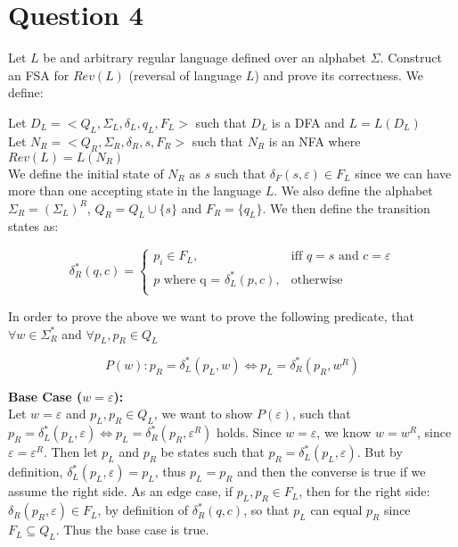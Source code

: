 \documentclass[20pt]{article}
\begin{document}
\section*{Question 4}
\begin{text}
    Let $L$ be and arbitrary regular language defined over an alphabet $\Sigma$. Construct an FSA for $Rev(L)$ (reversal of language $L$) and prove its correctness. We define:
    
    \noindent
    Let $D_L = <Q_L, \Sigma_L, \delta_L, q_L, F_L>$ such that $D_L$ is a DFA and $L = L(D_L)$\\
    Let $N_R = <Q_R, \Sigma_R, \delta_R, s, F_R>$ such that $N_R$ is an NFA where $Rev(L) = L(N_R)$\\
    We define the initial state of $N_R$ as $s$ such that $\delta_F(s,\varepsilon) \in F_L$ since we can have more than one accepting state in the language $L$. We also define the alphabet $\Sigma_R = (\Sigma_L)^R$, $Q_R = Q_L \cup \{s\}$ and $F_R = \{q_L\}$. We then define the transition states as:
\end{text}

\begin{equation}
    \delta_R^{*}(q, c) =
    \begin{cases}
      p_i \in F_L, & \text{iff $q = s$ and $c = \varepsilon$}\nonumber\\
      p \text{ where q = $\delta_L^*(p, c)$}, & \text{otherwise}\nonumber\\
    \end{cases}
\end{equation}

\noindent
\begin{text}
    In order to prove the above we want to prove the following predicate, that $\forall w \in \Sigma_R^*$ and $\forall p_L, p_R \in Q_L$
\end{text}

\begin{equation}
    P(w): p_R = \delta_L^*(p_L, w) \iff p_L = \delta_R^*(p_R, w^R)\nonumber
\end{equation}

\noindent
\begin{text}
    \noindent
    \textbf{Base Case ($w=\varepsilon$):}\\
    Let $w = \varepsilon$ and $p_L, p_R \in Q_L$, we want to show $P(\varepsilon)$, such that $p_R = \delta_L^*(p_L, \varepsilon) \iff p_L = \delta_R^*(p_R, \varepsilon^R)$ holds. Since $w = \varepsilon$, we know $w = w^R$, since $\varepsilon = \varepsilon^R$. Then let $p_L$ and $p_R$ be states such that $p_R = \delta_L^*(p_L, \varepsilon)$. But by definition, $\delta_L^*(p_L, \varepsilon) = p_L$, thus $p_L = p_R$ and then the converse is true if we assume the right side. As an edge case, if $p_L, p_R \in F_L$, then for the right side: $\delta_R(p_R, \varepsilon) \in F_L$, by definition of $\delta_R^*(q,c)$, so that $p_L$ can equal $p_R$ since $F_L \subseteq Q_L$. Thus the base case is true.
\end{text}
\end{document}
